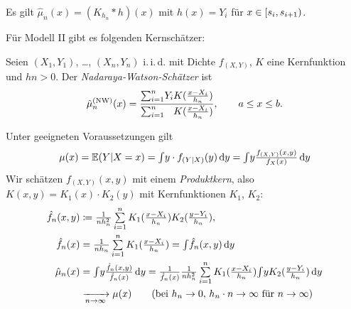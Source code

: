 \documentclass{cheat-sheet}
\newcommand{\Alg}{\mathfrak{A}} %
\renewcommand{\P}{\mathbb{P}} %
\newcommand{\E}{\mathbb{E}} %
\newcommand{\iid}{i.\,i.\,d.} %
\begin{document}
\begin{bem}
  Es gilt $\hat{\mu}_n(x) = (K_{h_n} * h)(x)$ mit $h(x) = Y_i$ für $x \in \left[ s_i, s_{i+1} \right)$.
\end{bem}


\iffalse
  Motivation: $\E \hat{\mu}_n(x) = \tfrac{1}{n h_n} \sum_{i=1}^n \E Y_i \Int{s_{i-1}}{s_i}{K(\tfrac{x-s}{h_n})}{s} = \tfrac{1}{n} \sum_{i=1}^n \mu(x_i) \Int{s_{i-1}/h_n}{s_i/h_n}{K(\tfrac{x}{h_n} - t)}{t} = \tfrac{1}{h} \sum_{i=1}^n \mu(x_i) \Int{(x-s_{i-1})/h_n}{(x-s_i)/h_n}{K(y)}{y} \approx \mu(x)$
\fi

Für Modell II gibt es folgenden Kernschätzer:

\begin{defn}
  Seien $(X_1, Y_1)$, \ldots, $(X_n, Y_n)$ \iid{} mit Dichte $f_{(X,Y)}$, $K$ eine Kernfunktion und $hn > 0$.
  Der \emph{Nadaraya-Watson-Schätzer} ist
  \[
    \hat{\mu}^{\text{(NW)}}_n (x) = \frac{{\sum}_{i=1}^n Y_i K(\tfrac{x - X_i}{h_n})}{{\sum}_{i=1}^n \hphantom{Y_i} K(\tfrac{x - X_i}{h_n})}, \qquad
    a \leq x \leq b.
  \]
\end{defn}


\begin{motivation}
  Unter geeigneten Voraussetzungen gilt
  \[
    \mu(x) = \E(Y|X=x) = \IInt{y \cdot f_{(Y|X)}(y)}{y} = \IInt{y \tfrac{f_{(X,Y)}(x,y)}{f_X(x)}}{y}
  \]
  Wir schätzen $f_{(X,Y)}(x,y)$ mit einem \textit{Produktkern}, also $K(x, y) = K_1(x) \cdot K_2(y)$ mit Kernfunktionen $K_1$, $K_2$:
  \begin{align*}
    \hat{f}_n(x, y) & \coloneqq \tfrac{1}{n h_n^2} \sum_{i=1}^n K_1(\tfrac{x-X_i}{h_n}) K_2(\tfrac{y-Y_i}{h_n}), \\
    \hat{f}_n(x) & = \tfrac{1}{n h_n} \sum_{i=1}^n K_1(\tfrac{x - X_i}{h_n}) = \IInt{\hat{f}_n(x,y)}{y} \\
    \hat{\mu}_n (x) & = \IInt{y \tfrac{\hat{f}_n(x,y)}{\hat{f}_n(x)}}{y} = \tfrac{1}{\hat{f}_n(x)} \tfrac{1}{n h_n^2} \sum_{i=1}^n K_1(\tfrac{x - X_i}{h_n}) \IInt{y K_2(\tfrac{y - Y_i}{h_n})}{y} \\
    & \xra[n \to \infty]{} \mu(x) \qquad
    \text{(bei $h_n \to 0$, $h_n \cdot n \to \infty$ für $n \to \infty$)}
  \end{align*}
\end{motivation}
\end{document}
